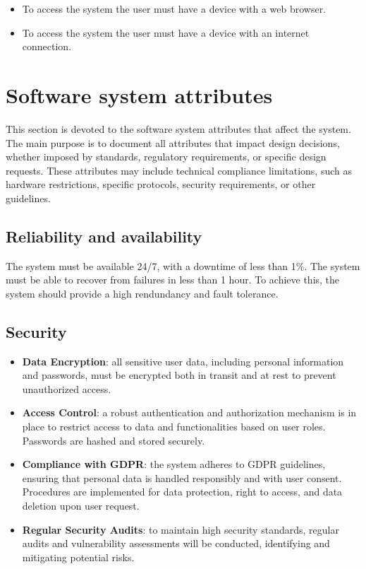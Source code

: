 \begin{itemize}
    \item To access the system the user must have a device with a web browser.
    \item To access the system the user must have a device with an internet connection.
\end{itemize}


\section{Software system attributes}

This section is devoted to the software system attributes that affect the system.
The main purpose is to document all attributes that impact design decisions, whether imposed by standards, regulatory requirements, or specific design requests.
These attributes may include technical compliance limitations, such as hardware restrictions, specific protocols, security requirements, or other guidelines.

\subsection{Reliability and availability}

The system must be available 24/7, with a downtime of less than 1\%.
The system must be able to recover from failures in less than 1 hour.
To achieve this, the system should provide a high rendundancy and fault tolerance.

\subsection{Security}

\begin{itemize}
    \item \textbf{Data Encryption}: all sensitive user data, including personal information and passwords, must be encrypted both in transit and at rest to prevent unauthorized access.
    \item \textbf{Access Control}: a robust authentication and authorization mechanism is in place to restrict access to data and functionalities based on user roles. Passwords are hashed and stored securely.
    \item \textbf{Compliance with GDPR}: the system adheres to GDPR guidelines, ensuring that personal data is handled responsibly and with user consent. Procedures are implemented for data protection, right to access, and data deletion upon user request.
    \item \textbf{Regular Security Audits}: to maintain high security standards, regular audits and vulnerability assessments will be conducted, identifying and mitigating potential risks.
\end{itemize}

